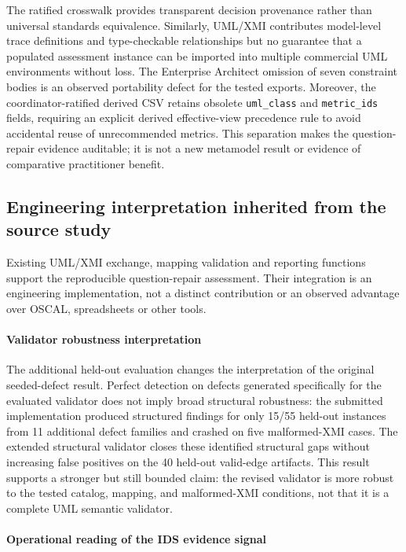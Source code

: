 \documentclass[12pt,a4paper]{article}
\begin{document}
The ratified crosswalk provides transparent decision provenance rather than universal standards equivalence. Similarly, UML/XMI contributes model-level trace definitions and type-checkable relationships but no guarantee that a populated assessment instance can be imported into multiple commercial UML environments without loss. The Enterprise Architect omission of seven constraint bodies is an observed portability defect for the tested exports. Moreover, the coordinator-ratified derived CSV retains obsolete \texttt{uml\_class} and \texttt{metric\_ids} fields, requiring an explicit derived effective-view precedence rule to avoid accidental reuse of unrecommended metrics. This separation makes the question-repair evidence auditable; it is not a new metamodel result or evidence of comparative practitioner benefit.


\subsection{Engineering interpretation inherited from the source study}



Existing UML/XMI exchange, mapping validation and reporting functions support the reproducible question-repair assessment. Their integration is an engineering implementation, not a distinct contribution or an observed advantage over OSCAL, spreadsheets or other tools.

\paragraph{Validator robustness interpretation}

The additional held-out evaluation changes the interpretation of the original seeded-defect result. Perfect detection on defects generated specifically for the evaluated validator does not imply broad structural robustness: the submitted implementation produced structured findings for only 15/55 held-out instances from 11 additional defect families and crashed on five malformed-XMI cases. The extended structural validator closes these identified structural gaps without increasing false positives on the 40 held-out valid-edge artifacts. This result supports a stronger but still bounded claim: the revised validator is more robust to the tested catalog, mapping, and malformed-XMI conditions, not that it is a complete UML semantic validator.


\paragraph{Operational reading of the IDS evidence signal}
\end{document}

